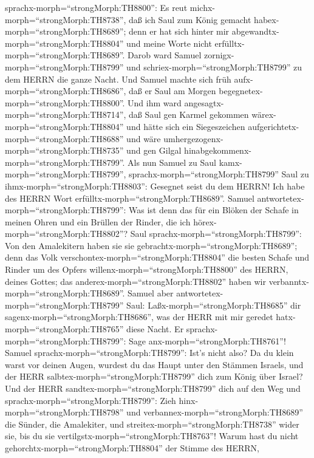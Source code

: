 sprachx-morph=``strongMorph:TH8800'':  Es reut
michx-morph=``strongMorph:TH8738'', daß ich Saul zum König gemacht
habex-morph=``strongMorph:TH8689''; denn er hat sich hinter mir
abgewandtx-morph=``strongMorph:TH8804'' und meine Worte nicht
erfülltx-morph=``strongMorph:TH8689''. Darob ward Samuel
zornigx-morph=``strongMorph:TH8799'' und
schriex-morph=``strongMorph:TH8799'' zu dem HERRN die ganze Nacht.
 Und Samuel machte sich früh
aufx-morph=``strongMorph:TH8686'', daß er Saul am Morgen
begegnetex-morph=``strongMorph:TH8800''. Und ihm ward
angesagtx-morph=``strongMorph:TH8714'', daß Saul gen Karmel gekommen
wärex-morph=``strongMorph:TH8804'' und hätte sich ein Siegeszeichen
aufgerichtetx-morph=``strongMorph:TH8688'' und wäre
umhergezogenx-morph=``strongMorph:TH8735'' und gen Gilgal
hinabgekommenx-morph=``strongMorph:TH8799''.  Als nun
Samuel zu Saul kamx-morph=``strongMorph:TH8799'',
sprachx-morph=``strongMorph:TH8799'' Saul zu
ihmx-morph=``strongMorph:TH8803'': Gesegnet seist du dem HERRN! Ich habe
des HERRN Wort erfülltx-morph=``strongMorph:TH8689''. 
Samuel antwortetex-morph=``strongMorph:TH8799'': Was ist denn das für
ein Blöken der Schafe in meinen Ohren und ein Brüllen der Rinder, die
ich hörex-morph=``strongMorph:TH8802''?  Saul
sprachx-morph=``strongMorph:TH8799'': Von den Amalekitern haben sie sie
gebrachtx-morph=``strongMorph:TH8689''; denn das Volk
verschontex-morph=``strongMorph:TH8804'' die besten Schafe und Rinder um
des Opfers willenx-morph=``strongMorph:TH8800'' des HERRN, deines
Gottes; das anderex-morph=``strongMorph:TH8802'' haben wir
verbanntx-morph=``strongMorph:TH8689''.  Samuel aber
antwortetex-morph=``strongMorph:TH8799'' Saul:
Laßx-morph=``strongMorph:TH8685'' dir
sagenx-morph=``strongMorph:TH8686'', was der HERR mit mir geredet
hatx-morph=``strongMorph:TH8765'' diese Nacht. Er
sprachx-morph=``strongMorph:TH8799'': Sage
anx-morph=``strongMorph:TH8761''!  Samuel
sprachx-morph=``strongMorph:TH8799'': Ist's nicht also? Da du klein
warst vor deinen Augen, wurdest du das Haupt unter den Stämmen Israels,
und der HERR salbtex-morph=``strongMorph:TH8799'' dich zum König über
Israel?  Und der HERR sandtex-morph=``strongMorph:TH8799''
dich auf den Weg und sprachx-morph=``strongMorph:TH8799'': Zieh
hinx-morph=``strongMorph:TH8798'' und
verbannex-morph=``strongMorph:TH8689'' die Sünder, die Amalekiter, und
streitex-morph=``strongMorph:TH8738'' wider sie, bis du sie
vertilgstx-morph=``strongMorph:TH8763''!  Warum hast du
nicht gehorchtx-morph=``strongMorph:TH8804'' der Stimme des HERRN,
